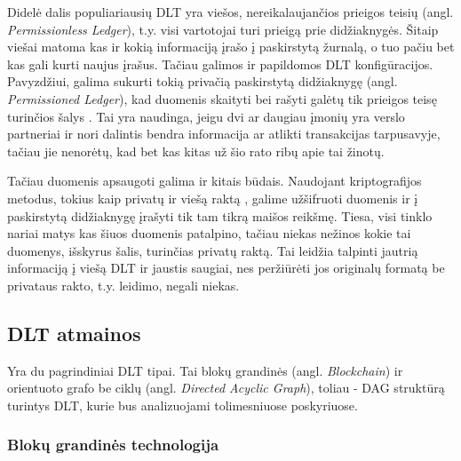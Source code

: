 Didelė dalis populiariausių DLT yra viešos, nereikalaujančios prieigos teisių (angl. \textit{Permissionless Ledger}), t.y. visi vartotojai turi prieigą prie didžiaknygės. Šitaip viešai matoma kas ir kokią informaciją įrašo į paskirstytą žurnalą, o tuo pačiu bet kas gali kurti naujus įrašus. Tačiau galimos ir papildomos DLT konfigūracijos. Pavyzdžiui, galima sukurti tokią privačią paskirstytą didžiaknygę (angl. \textit{Permissioned Ledger}), kad duomenis skaityti bei rašyti galėtų tik prieigos teisę turinčios šalys \cite{backlund2016technical}. Tai yra naudinga, jeigu dvi ar daugiau įmonių yra verslo partneriai ir nori dalintis bendra informacija ar atlikti transakcijas tarpusavyje, tačiau jie nenorėtų, kad bet kas kitas už šio rato ribų apie tai žinotų. 

Tačiau duomenis apsaugoti galima ir kitais būdais. Naudojant kriptografijos metodus, tokius kaip privatų ir viešą raktą \cite{zyskind2015decentralizing}, galime užšifruoti duomenis ir į paskirstytą didžiaknygę įrašyti tik tam tikrą maišos reikšmę. Tiesa, visi tinklo nariai matys kas šiuos duomenis patalpino, tačiau niekas nežinos kokie tai duomenys, išskyrus šalis, turinčias privatų raktą. Tai leidžia talpinti jautrią informaciją į viešą DLT ir jaustis saugiai, nes peržiūrėti jos originalų formatą be privataus rakto, t.y. leidimo, negali niekas.




\subsection{DLT atmainos}

Yra du pagrindiniai DLT tipai. Tai blokų grandinės (angl. \textit{Blockchain}) ir orientuoto grafo be ciklų (angl. \textit{Directed Acyclic Graph}), toliau - DAG struktūrą turintys DLT, kurie bus analizuojami tolimesniuose poskyriuose.




\subsubsection{Blokų grandinės technologija}


